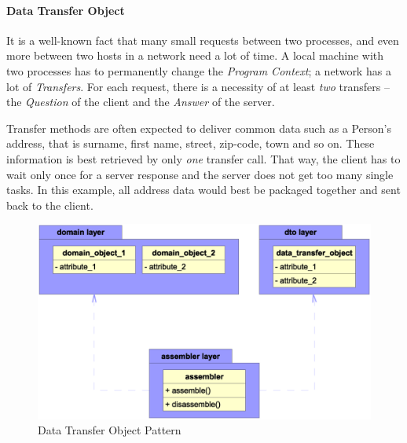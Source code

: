 %
%
%
%
%
%
%

\paragraph{Data Transfer Object}
\label{data_transfer_object_heading}

It is a well-known fact that many small requests between two processes, and
even more between two hosts in a network need a lot of time. A local machine
with two processes has to permanently change the \emph{Program Context}; a
network has a lot of \emph{Transfers}. For each request, there is a necessity
of at least \emph{two} transfers -- the \emph{Question} of the client and the
\emph{Answer} of the server.

Transfer methods are often expected to deliver common data such as a Person's
address, that is surname, first name, street, zip-code, town and so on. These
information is best retrieved by only \emph{one} transfer call. That way, the
client has to wait only once for a server response and the server does not get
too many single tasks. In this example, all address data would best be packaged
together and sent back to the client.

\begin{figure}[ht]
    \begin{center}
       \includegraphics[scale=0.3]{vector/dto.eps}
       \caption{Data Transfer Object Pattern}
       \label{dto_figure}
    \end{center}
\end{figure}

